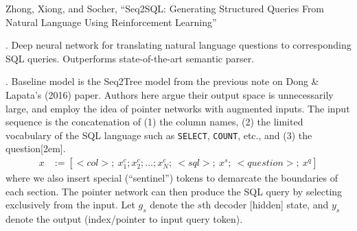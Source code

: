 \documentclass[11pt]{article}
\begin{document}
\vspace{-1em}
{\footnotesize Zhong, Xiong, and Socher, ``Seq2SQL: Generating Structured Queries From Natural Language Using Reinforcement Learning''}

\p {}. Deep neural network for translating natural language questions to corresponding SQL queries. Outperforms state-of-the-art semantic parser.

\myspace
\p {}. Baseline model is the Seq2Tree model from the previous note on Dong \& Lapata's (2016) paper. Authors here argue their output space is unnecessarily large, and employ the idea of pointer networks with augmented inputs. The input sequence is the concatenation of (1) the column names, (2) the limited vocabulary of the SQL language such as \texttt{SELECT}, \texttt{COUNT}, etc., and (3) the question[2em].
\begin{align}
x &:= \left[
<col>;~
x_1^c; x_2^c; \ldots; x_N^c;~
<sql>;~
x^s;~
<question>;~
x^q
\right]
\end{align}
where we also insert special (``sentinel'') tokens to demarcate the boundaries of each section. The pointer network can then produce the SQL query by selecting exclusively from the input. Let $g_s$ denote the $s$th decoder [hidden] state, and $y_s$ denote the output (index/pointer to input query token).
\end{document}
